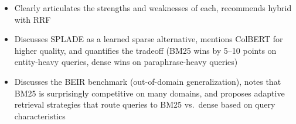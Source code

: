 \begin{interviewq}
\goodgreat
\begin{itemize}
    \item {} Clearly articulates the strengths and weaknesses of each,
          recommends hybrid with RRF
    \item {} Discusses SPLADE as a learned sparse alternative, mentions
          ColBERT for higher quality, and quantifies the tradeoff (BM25 wins by
          5--10 points on entity-heavy queries, dense wins on paraphrase-heavy queries)
    \item {} Discusses the BEIR benchmark (out-of-domain generalization),
          notes that BM25 is surprisingly competitive on many domains, and proposes
          adaptive retrieval strategies that route queries to BM25 vs.\ dense based
          on query characteristics
\end{itemize}

\end{interviewq}

\bigskip

